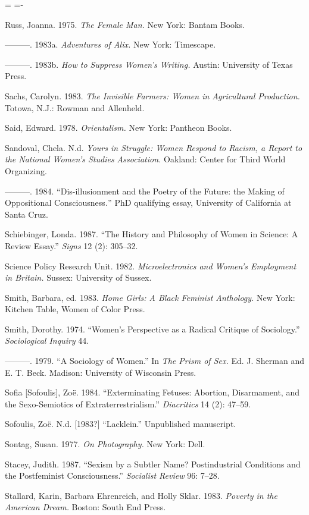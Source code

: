 \documentclass[DIV=12,%
               BCOR=10mm,%
               headinclude=false,%
               footinclude=false,open=any,%
               fontsize=11pt,%
               twoside,%
               paper=210mm:11in]%
               {scrbook}
\newenvironment*{amusebiblio}{
  \leftskip=\parindent
  \parindent=-\parindent
  \smallskip
  \indent
}{\smallskip}
\begin{document}
\begin{amusebiblio}
Russ, Joanna. 1975. \emph{The Female Man.} New York: Bantam Books.


———. 1983a. \emph{Adventures of Alix.} New York: Timescape.


———. 1983b. \emph{How to Suppress Women’s Writing.} Austin: University of Texas Press.


Sachs, Carolyn. 1983. \emph{The Invisible Farmers: Women in Agricultural Production.} Totowa, N.J.: Rowman and Allenheld.


Said, Edward. 1978. \emph{Orientalism.} New York: Pantheon Books.


Sandoval, Chela. N.d. \emph{Yours in Struggle: Women Respond to Racism, a Report to the National Women’s Studies Association.} Oakland: Center for Third World Organizing.


———. 1984. “Dis-illusionment and the Poetry of the Future: the Making of Oppositional Consciousness\emph{.}” PhD qualifying essay, University of California at Santa Cruz.


Schiebinger, Londa. 1987. “The History and Philosophy of Women in Science: A Review Essay.” \emph{Signs} 12 (2): 305–32.


Science Policy Research Unit. 1982. \emph{Microelectronics and Women’s Employment in Britain.} Sussex: University of Sussex.


Smith, Barbara, ed. 1983. \emph{Home Girls: A Black Feminist Anthology.} New York: Kitchen Table, Women of Color Press.


Smith, Dorothy. 1974. “Women’s Perspective as a Radical Critique of Sociology.” \emph{Sociological Inquiry} 44.


———. 1979. “A Sociology of Women.” In \emph{The Prism of Sex.} Ed. J. Sherman and E. T. Beck. Madison: University of Wisconsin Press.


Sofia [Sofoulis], Zoë. 1984. “Exterminating Fetuses: Abortion, Disarmament, and the Sexo-Semiotics of Extraterrestrialism.” \emph{Diacritics} 14 (2): 47–59.


Sofoulis, Zoë. N.d. [1983?] “Lacklein.” Unpublished manuscript.


Sontag, Susan. 1977. \emph{On Photography.} New York: Dell.


Stacey, Judith. 1987. “Sexism by a Subtler Name? Postindustrial Conditions and the Postfeminist Consciousness.” \emph{Socialist Review} 96: 7–28.


Stallard, Karin, Barbara Ehrenreich, and Holly Sklar. 1983. \emph{Poverty in the American Dream.} Boston: South End Press.



\end{amusebiblio}
\end{document}
